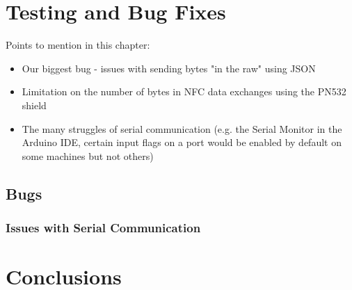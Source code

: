 \documentclass[12pt]{report}
\let\Oldsection\section
\renewcommand{\section}{\FloatBarrier\Oldsection}
\let\Oldsubsection\subsection
\renewcommand{\subsection}{\FloatBarrier\Oldsubsection}
\begin{document}

\chapter{Testing and Bug Fixes} \label{testing-and-bug-fixes}

Points to mention in this chapter:
\begin{itemize}
    \item Our biggest bug - issues with sending bytes "in the raw" using JSON
    \item Limitation on the number of bytes in NFC data exchanges using the PN532 shield
    \item The many struggles of serial communication (e.g. the Serial Monitor in the Arduino IDE, certain input flags 
    on a port would be enabled by default on some machines but not others)
\end{itemize}


\section{Bugs} \label{bugs}

\subsection{Issues with Serial Communication} \label{issues-with-serial-communcation}


\chapter{Conclusions} \label{conclusions}


\printbibliography


\appendix

\end{document}
